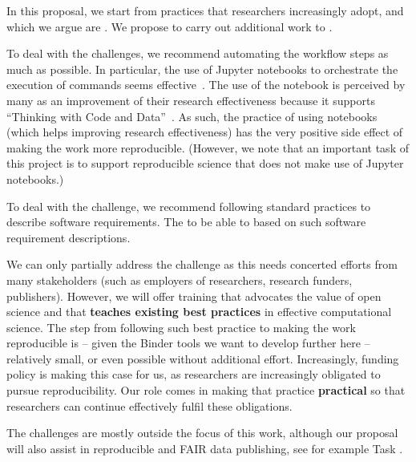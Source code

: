 In this proposal, we start from practices that researchers increasingly adopt,
and which we argue are . We propose to carry
out additional work to .

To deal with the  challenges, we recommend automating the
workflow steps as much as possible. In particular, the use of Jupyter notebooks
to orchestrate the execution of commands seems effective~\cite{Beg2021}.
The use of the notebook is
perceived by many as an improvement of their research effectiveness because
it supports ``Thinking with Code and Data''~\cite{Granger2021}. As such, the
practice of using notebooks (which helps improving research effectiveness) has
the very positive side effect of making the work more reproducible. (However, we
note that an important task of this project is to support reproducible science
that does not make use of Jupyter notebooks.)

To deal with the  challenge, we recommend following
standard practices to describe software requirements. The  to be able to
 based on such software
requirement descriptions.

We can only partially address the  challenge as this needs
concerted efforts from many stakeholders (such as employers of researchers,
research funders, publishers). However, we will offer training that advocates
the value of open science and that \textbf{teaches existing best practices} in
effective computational science. The step from following such best practice to
making the work reproducible is -- given the Binder tools we want to develop
further here -- relatively small, or even possible without additional effort.
Increasingly, funding policy is making this case for us,
as researchers are increasingly obligated to pursue reproducibility.
Our role comes in making that practice \textbf{practical}
so that researchers can continue effectively fulfil these obligations.

The  challenges are mostly outside the focus of this work,
although our proposal will also assist in reproducible and FAIR data
publishing, see for example Task .



